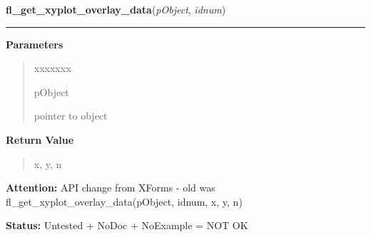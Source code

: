\hspace{.8\funcindent}\begin{boxedminipage}{\funcwidth}

    \raggedright \textbf{fl\_get\_xyplot\_overlay\_data}(\textit{pObject}, \textit{idnum})

    \vspace{-1.5ex}

    \rule{\textwidth}{0.5\fboxrule}
\setlength{\parskip}{2ex}
\setlength{\parskip}{1ex}
      \textbf{Parameters}
      \vspace{-1ex}

      \begin{quote}
        \begin{Ventry}{xxxxxxx}

          \item[pObject]

          pointer to object

        \end{Ventry}

      \end{quote}

      \textbf{Return Value}
    \vspace{-1ex}

      \begin{quote}
      x, y, n

      \end{quote}

\textbf{Attention:} API change from XForms - old was fl\_get\_xyplot\_overlay\_data(pObject, 
idnum, x, y, n)



\textbf{Status:} Untested + NoDoc + NoExample = NOT OK



    \end{boxedminipage}

    \label{xformslib:library:fl_set_xyplot_overlay_type}

    \vspace{0.5ex}

